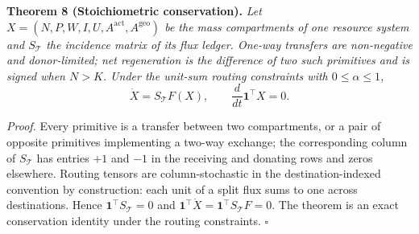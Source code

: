 \documentclass[11pt]{article}
\begin{document}
\textbf{Theorem 8 (Stoichiometric conservation).} \emph{Let
\(X = (N, P, W, I, U, A^{\mathrm{act}}, A^{\mathrm{geo}})\) be the mass
compartments of one resource system and \(S_{\mathcal{T}}\) the
incidence matrix of its flux ledger. One-way transfers are non-negative
and donor-limited; net regeneration is the difference of two such
primitives and is signed when \(N > K\). Under the unit-sum routing
constraints with \(0 \le \alpha \le 1\),}
\[\dot X = S_{\mathcal{T}} F(X), \qquad \frac{d}{dt}\mathbf{1}^\top X = 0.\]

\emph{Proof.} Every primitive is a transfer between two compartments, or
a pair of opposite primitives implementing a two-way exchange; the
corresponding column of \(S_{\mathcal{T}}\) has entries \(+1\) and
\(-1\) in the receiving and donating rows and zeros elsewhere. Routing
tensors are column-stochastic in the destination-indexed convention by
construction: each unit of a split flux sums to one across destinations.
Hence \(\mathbf{1}^\top S_{\mathcal{T}} = 0\) and
\(\mathbf{1}^\top \dot X = \mathbf{1}^\top S_{\mathcal{T}} F = 0\). The
theorem is an exact conservation identity under the routing constraints.
\ensuremath{\square}
\end{document}
